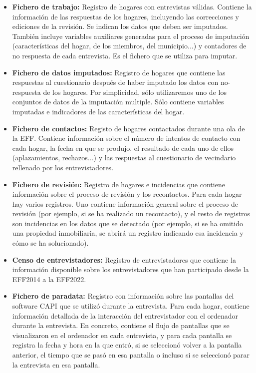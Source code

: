 \begin{itemize}
    \item \textbf{Fichero de trabajo:} Registro de hogares con entrevistas válidas. Contiene la información de las respuestas de los hogares, incluyendo las correcciones y ediciones de la revisión. Se indican los datos que deben ser imputados. También incluye variables auxiliares generadas para el proceso de imputación (características del hogar, de los miembros, del municipio...) y contadores de no respuesta de cada entrevista. Es el fichero que se utiliza para imputar.
    \item \textbf{Fichero de datos imputados:} Registro de hogares que contiene las respuestas al cuestionario después de haber imputado los datos con no-respuesta de los hogares. Por simplicidad, sólo utilizaremos uno de los conjuntos de datos de la imputación multiple. Sólo contiene variables imputadas e indicadores de las características del hogar.
    \item \textbf{Fichero de contactos:} Registo de hogares contactados durante una ola de la EFF. Contiene información sobre el número de intentos de contacto con cada hogar, la fecha en que se produjo, el resultado de cada uno de ellos (aplazamientos, rechazos...) y las respuestas al cuestionario de vecindario rellenado por los entrevistadores.
    \item \textbf{Fichero de revisión:} Registro de hogares e incidencias que contiene información sobre el proceso de revisión y los recontactos. Para cada hogar hay varios registros. Uno contiene información general sobre el proceso de revisión (por ejemplo, si se ha realizado un recontacto), y el resto de registros son incidencias en los datos que se detectado (por ejemplo, si se ha omitido una propiedad inmobiliaria, se abrirá un registro indicando esa incidencia y cómo se ha solucionado).
    \item \textbf{Censo de entrevistadores:} Registro de entrevistadores que contiene la información disponible sobre los entrevistadores que han participado desde la EFF2014 a la EFF2022.
    \item \textbf{Fichero de paradata:} Registro con información sobre las pantallas del software CAPI que se utilizó durante la entrevista. Para cada hogar, contiene información detallada de la interacción del entrevistador con el ordenador durante la entrevista. En concreto, contiene el flujo de pantallas que se visualizaron en el ordenador en cada entrevista, y para cada pantalla se registra la fecha y hora en la que entró, si se seleccionó volver a la pantalla anterior, el tiempo que se pasó en esa pantalla o incluso si se seleccionó parar la entrevista en esa pantalla.
\end{itemize}

